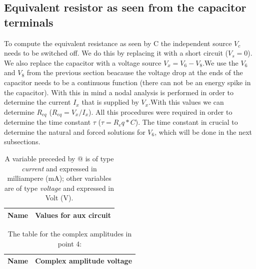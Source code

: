 \subsection{Equivalent resistor as seen from the capacitor terminals}

To compute the equivalent resistance as seen by C the independent source $V_c$ needs to be switched off. We do this by replacing it with a short circuit ($V_s=0$). We also replace the capacitor with a voltage source $V_x=V_6-V_8$.We use the $V_6$ and $V_8$ from the previous section beacause the voltage drop at the ends of the capacitor needs to be a continuous function (there can not be an energy spike in the capacitor). With this in mind a nodal analysis is performed in order to determine the current $I_x$ that is supplied by $V_x$.With this values we can determine $R_{eq}$ ($R_{eq}=V_x/I_x$). All this procedures were required in order to determine the time constant $\tau$ ($\tau=R_eq*C$). The time constant in crucial to determine the natural and forced solutions for $V_6$, which will be done in the next subsections. 

 \pagebreak 
\begin{table}[h]
  \centering
  \begin{tabular}{|l|r|}
    \hline    
    {\bf Name} & {\bf Values for aux circuit}\\ \hline
    
  \end{tabular}
  \caption{A variable preceded by @ is of type {\em current}
    and expressed in milliampere (mA); other variables are of type {\it voltage} and expressed in
    Volt (V).}
  \label{tab:equivalent resistor}
\end{table}



 \pagebreak 
\begin{table}[h]
  \centering
  \begin{tabular}{|l|r|}
    \hline    
    {\bf Name} & {\bf Complex amplitude voltage}\\ \hline
    
  \end{tabular}
  \caption{The table for the complex amplitudes in point 4:}
  \label{tab:equivalent resistor}
\end{table}


